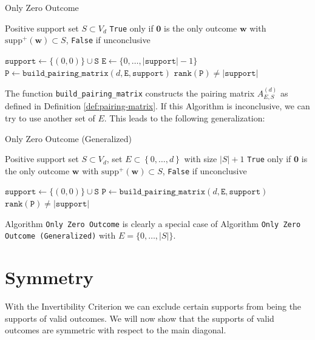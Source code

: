 \begin{algorithm}[H]
\caption{Only Zero Outcome}\label{alg:hyperfield_criterion:is_zero}
    \begin{algorithmic}[1]
    \Require Positive support set $S \subset {V_d}$
    \Ensure \texttt{True} only if \( \mathbf{0} \) is the only outcome \( \mathbf{w} \) with \( \mathrm{supp}^+(\mathbf{w}) \subset S \), \texttt{False} if unconclusive

    \State $\texttt{support} \gets \{(0,0)\} \cup \texttt{S}$
    \State $\texttt{E} \gets \{0, \dots, |\texttt{support}| - 1\}$
    \State $\texttt{P} \gets \texttt{build\_pairing\_matrix}(d, \texttt{E}, \texttt{support})$    
    \State \Return $\texttt{rank}(\texttt{P}) \neq |\texttt{support}|$
    \end{algorithmic}  
\end{algorithm}

The function \texttt{build\_pairing\_matrix} constructs the pairing matrix \( A^{(d)}_{E,S} \) as defined in Definition \ref{def:pairing-matrix}. If this Algorithm is inconclusive, we can try to use another set of \( E \). This leads to the following generalization:

\begin{algorithm}[H]
\caption{Only Zero Outcome (Generalized)}\label{alg:hyperfield_criterion:is_zero_general}
    \begin{algorithmic}[1]
    \Require Positive support set $S \subset {V_d}$, set \( E \subset \left\{ 0, \dots, d \right\} \) with size \( \lvert S \vert + 1 \)
    \Ensure \texttt{True} only if \( \mathbf{0} \) is the only outcome \( \mathbf{w} \) with \( \mathrm{supp}^+(\mathbf{w}) \subset S \), \texttt{False} if unconclusive

    \State $\texttt{support} \gets \{(0,0)\} \cup \texttt{S}$
    \State $\texttt{P} \gets \texttt{build\_pairing\_matrix}(d, \texttt{E}, \texttt{support})$    
    \State \Return $\texttt{rank}(\texttt{P}) \neq |\texttt{support}|$
    \end{algorithmic}  
\end{algorithm}

Algorithm \texttt{Only Zero Outcome} is clearly a special case of Algorithm \texttt{Only Zero Outcome (Generalized)} with \( E =  \{0, \dots, |{S}|\}\).

\section{Symmetry}

With the Invertibility Criterion we can exclude certain supports from being the supports of valid outcomes. We will now show that the supports of valid outcomes are symmetric with respect to the main diagonal.

